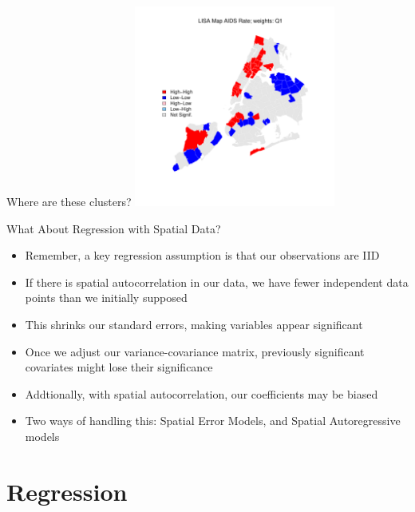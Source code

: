 \documentclass[aspectratio = 169, 12pt]{beamer}\usepackage[]{graphicx}\usepackage[]{color}
\newenvironment{knitrout}{}{} %
\begin{document}
\begin{frame}[fragile]{Where are these clusters?}
\begin{knitrout}\tiny
{}\color{fgcolor}
\includegraphics[width=250px]{figure/unnamed-chunk-7-1} 

\end{knitrout}
\end{frame}

\begin{frame}{What About Regression with Spatial Data?}
\begin{itemize}
\item Remember, a key regression assumption is that our observations are IID
\item If there is spatial autocorrelation in our data, we have fewer independent data points than we initially supposed
\item This shrinks our standard errors, making variables appear significant
\item Once we adjust our variance-covariance matrix, previously significant covariates might lose their significance 
\item Addtionally, with spatial autocorrelation, our coefficients may be biased 
\item Two ways of handling this: Spatial Error Models, and Spatial Autoregressive models
\end{itemize}
\end{frame}

\section{Regression}
\end{document}
